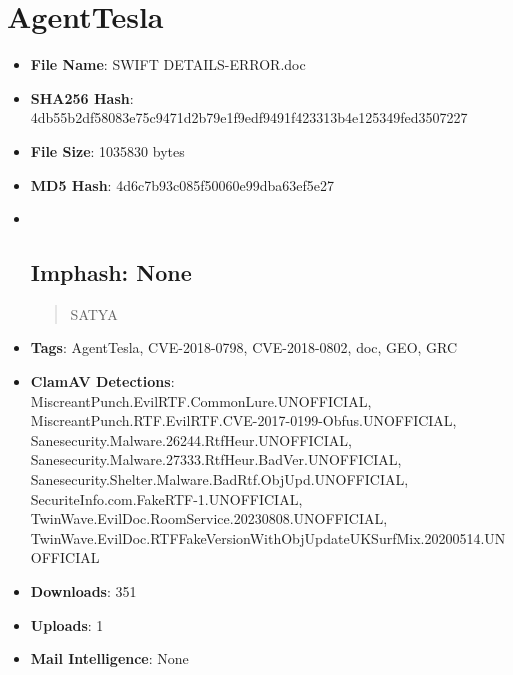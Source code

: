 \documentclass[
  a4paper,
]{report}
\author{}
\date{}
\begin{document}
\hypertarget{agenttesla}{%
\chapter{AgentTesla}\label{agenttesla}}

\begin{itemize}
\item
  \textbf{File Name}: SWIFT DETAILS-ERROR.doc
\item
  \textbf{SHA256 Hash}:
  4db55b2df58083e75c9471d2b79e1f9edf9491f423313b4e125349fed3507227
\item
  \textbf{File Size}: 1035830 bytes
\item
  \textbf{MD5 Hash}: 4d6c7b93c085f50060e99dba63ef5e27
\item ~
  \hypertarget{imphash-none}{%
  \section{\texorpdfstring{\textbf{Imphash}:
  None}{Imphash: None}}\label{imphash-none}}

  \begin{quote}
  SATYA
  \end{quote}
\item
  \textbf{Tags}: AgentTesla, CVE-2018-0798, CVE-2018-0802, doc, GEO, GRC
\item
  \textbf{ClamAV Detections}:
  MiscreantPunch.EvilRTF.CommonLure.UNOFFICIAL,
  MiscreantPunch.RTF.EvilRTF.CVE-2017-0199-Obfus.UNOFFICIAL,
  Sanesecurity.Malware.26244.RtfHeur.UNOFFICIAL,
  Sanesecurity.Malware.27333.RtfHeur.BadVer.UNOFFICIAL,
  Sanesecurity.Shelter.Malware.BadRtf.ObjUpd.UNOFFICIAL,
  SecuriteInfo.com.FakeRTF-1.UNOFFICIAL,
  TwinWave.EvilDoc.RoomService.20230808.UNOFFICIAL,
  TwinWave.EvilDoc.RTFFakeVersionWithObjUpdateUKSurfMix.20200514.UNOFFICIAL
\item
  \textbf{Downloads}: 351
\item
  \textbf{Uploads}: 1
\item
  \textbf{Mail Intelligence}: None
\end{itemize}
\end{document}
